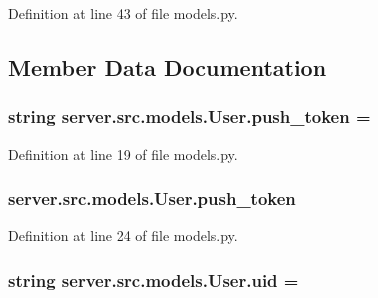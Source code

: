 Definition at line 43 of file models.\+py.



\subsection{Member Data Documentation}
\subsubsection[{\texorpdfstring{push\+\_\+token}{push_token}}]{\setlength{\rightskip}{0pt plus 5cm}string server.\+src.\+models.\+User.\+push\+\_\+token = \textquotesingle{}\textquotesingle{}\hspace{0.3cm}{\ttfamily [static]}}\hypertarget{classserver_1_1src_1_1models_1_1_user_ab6574a566e1351de30f59603fcb5f087}{}\label{classserver_1_1src_1_1models_1_1_user_ab6574a566e1351de30f59603fcb5f087}


Definition at line 19 of file models.\+py.

\subsubsection[{\texorpdfstring{push\+\_\+token}{push_token}}]{\setlength{\rightskip}{0pt plus 5cm}server.\+src.\+models.\+User.\+push\+\_\+token}\hypertarget{classserver_1_1src_1_1models_1_1_user_a14d1ac6e4c3bde5bb16d1393b881e907}{}\label{classserver_1_1src_1_1models_1_1_user_a14d1ac6e4c3bde5bb16d1393b881e907}


Definition at line 24 of file models.\+py.

\subsubsection[{\texorpdfstring{uid}{uid}}]{\setlength{\rightskip}{0pt plus 5cm}string server.\+src.\+models.\+User.\+uid = \textquotesingle{}\textquotesingle{}\hspace{0.3cm}{\ttfamily [static]}}\hypertarget{classserver_1_1src_1_1models_1_1_user_a9a4d7dce0947f4e81278a993244fb3e7}{}\label{classserver_1_1src_1_1models_1_1_user_a9a4d7dce0947f4e81278a993244fb3e7}


